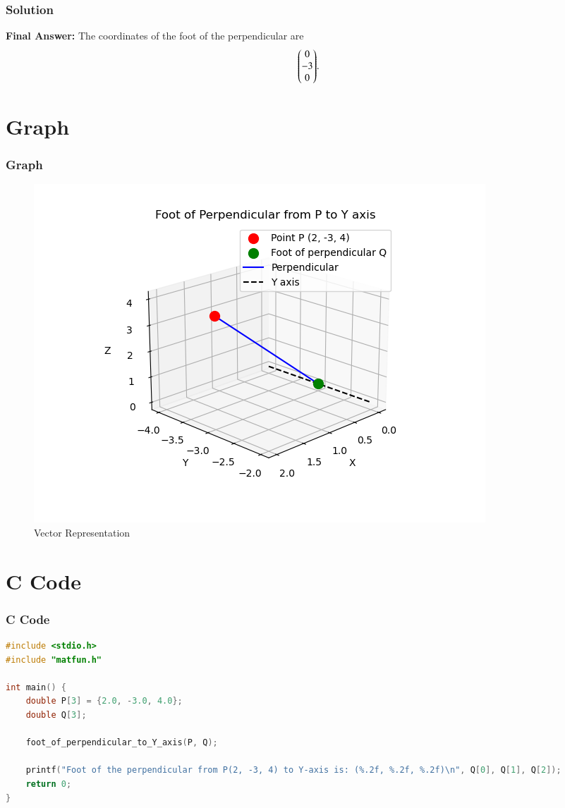 \documentclass{beamer}
\numberwithin{equation}{section}
\begin{document}
\begin{frame}[fragile]
    \frametitle{Solution}

\textbf{Final Answer:} The coordinates of the foot of the perpendicular are
\[
{\begin{pmatrix}0 \\ -3 \\ 0\end{pmatrix}}.
\]


\end{frame}
\section{Graph}
\begin{frame}
    \frametitle{Graph}
    \begin{figure}[htbp]
    \centering
    \includegraphics[width=0.65\linewidth]{FIG/fig1.png}
    \caption{Vector Representation}
    \label{fig:FIG/fig1.png}
\end{figure}
\end{frame}
\section{ C Code}
\begin{frame}[fragile]
\frametitle{C Code }
\begin{lstlisting}[language=C]
#include <stdio.h>
#include "matfun.h"

int main() {
    double P[3] = {2.0, -3.0, 4.0};
    double Q[3];

    foot_of_perpendicular_to_Y_axis(P, Q);

    printf("Foot of the perpendicular from P(2, -3, 4) to Y-axis is: (%.2f, %.2f, %.2f)\n", Q[0], Q[1], Q[2]);
    return 0;
}




    
\end{lstlisting}
\end{frame}
\end{document}
